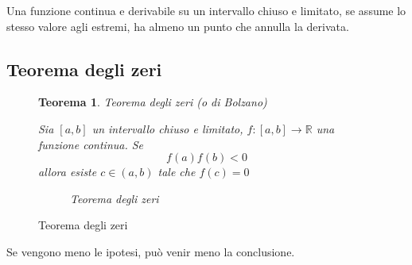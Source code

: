 \documentclass[a4paper]{article}
\newtheorem{theorem}{Teorema}
\theoremstyle{break}
\theoremstyle{break}
\theoremstyle{break}
\theoremstyle{break}
\begin{document}
Una funzione continua e derivabile su un intervallo chiuso e limitato, se assume lo stesso valore
agli estremi, ha almeno un punto che annulla la derivata.

\subsection{Teorema degli zeri}
\begin{figure}[H]
  \begin{theorem}
    Teorema degli zeri (o di Bolzano)

    Sia \( [a,b] \) un intervallo chiuso e limitato, \( f: [a,b] \to \mathbb{R} \) una funzione continua.
    Se
    \[
      f(a)f(b) < 0
    \]
    allora esiste \( c \in (a,b) \) tale che \( f(c) = 0 \)

    \begin{figure}[H]
      \begin{center}
      \end{center}
      \caption{Teorema degli zeri}
    \end{figure}

  \end{theorem}
\end{figure}
Se vengono meno le ipotesi, può venir meno la conclusione.
\end{document}

